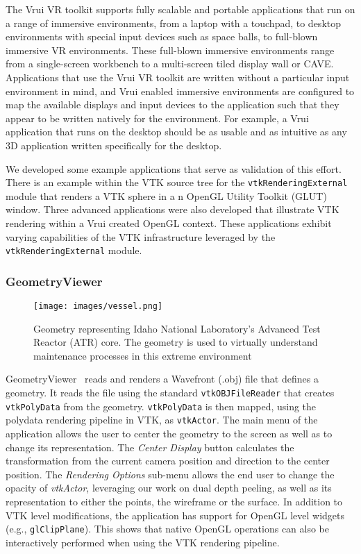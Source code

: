 The Vrui VR toolkit supports fully scalable and portable applications that run on a range of immersive environments, from a laptop with a touchpad, to desktop environments with special input devices such as space balls, to full-blown immersive VR environments. These full-blown immersive environments range from a single-screen workbench to a multi-screen tiled display wall or CAVE. Applications that use the Vrui VR toolkit are written without a particular input environment in mind, and Vrui enabled immersive environments are configured to map the available displays and input devices to the application such that they appear to be written natively for the environment. For example, a Vrui application that runs on the desktop should be as usable and as intuitive as any 3D application written specifically for the desktop.

We developed some example applications that serve as validation of this effort. There is an example within the VTK source tree for the \texttt{vtkRenderingExternal} module that renders a VTK sphere in a n OpenGL Utility Toolkit (GLUT) window. Three advanced applications were also developed that illustrate VTK rendering within a Vrui created OpenGL context. These applications exhibit varying capabilities of the VTK infrastructure leveraged by the \texttt{vtkRenderingExternal} module. 

\subsubsection{GeometryViewer}

\begin{figure}[h!]
 \centering
 \texttt{[image: images/vessel.png]}
 \caption{Geometry representing Idaho National Laboratory's Advanced Test Reactor (ATR) core. The geometry is used to virtually understand maintenance processes in this extreme environment}
 \label{fig:vessel}
\end{figure}

GeometryViewer~\cite{GeometryViewer} reads and renders a Wavefront (.obj) file that defines a geometry.
It reads the file using the standard \texttt{vtkOBJFileReader} that creates \texttt{vtkPolyData} from the geometry.
\texttt{vtkPolyData} is then mapped, using the polydata rendering pipeline in VTK, as \texttt{vtkActor}.
The main menu of the application allows the user to center the geometry to the screen as well as to change its representation.
The \textit{Center Display} button calculates the transformation from the current camera position and direction to the center position.
The \textit{Rendering Options} sub-menu allows the end user to change the opacity of \textit{vtkActor}, leveraging our work on dual depth peeling, as well as its representation to either the points, the wireframe or the surface.
In addition to VTK level modifications, the application has support for OpenGL level widgets (e.g., \texttt{glClipPlane}).
This shows that native OpenGL operations can also be interactively performed when using the VTK rendering pipeline.

